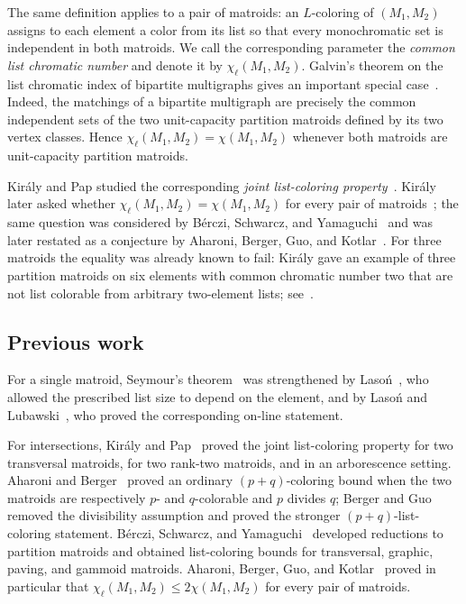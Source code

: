 \documentclass[10pt,a4paper]{article}
\theoremstyle{plain}
\theoremstyle{definition}
\begin{document}
The same definition applies to a pair of matroids: an $L$-coloring of $(M_1,M_2)$ assigns to each element a color from its list so that every monochromatic set is independent in both matroids. We call the corresponding parameter the \textit{common list chromatic number} and denote it by $\chi_\ell(M_1,M_2)$. Galvin's theorem on the list chromatic index of bipartite multigraphs gives an important special case~\cite{galvin1995list}. Indeed, the matchings of a bipartite multigraph are precisely the common independent sets of the two unit-capacity partition matroids defined by its two vertex classes. Hence $\chi_\ell(M_1,M_2)=\chi(M_1,M_2)$ whenever both matroids are unit-capacity partition matroids.

Kir\'aly and Pap studied the corresponding \textit{joint list-coloring property}~\cite{kiraly2010list}. Kir\'aly later asked whether $\chi_\ell(M_1,M_2)=\chi(M_1,M_2)$ for every pair of matroids~\cite{kiraly2013open}; the same question was considered by B\'erczi, Schwarcz, and Yamaguchi~\cite{berczi2021list} and was later restated as a conjecture by Aharoni, Berger, Guo, and Kotlar~\cite[Conjecture~5.4]{aharoni2025coloring}. For three matroids the equality was already known to fail: Kir\'aly gave an example of three partition matroids on six elements with common chromatic number two that are not list colorable from arbitrary two-element lists; see~\cite{berczi2021list}.

\subsection{Previous work}

For a single matroid, Seymour's theorem~\cite{seymour1998note} was strengthened by Laso\'n~\cite{lason2015list}, who allowed the prescribed list size to depend on the element, and by Laso\'n and Lubawski~\cite{lason2017online}, who proved the corresponding on-line statement.

For intersections, Kir\'aly and Pap~\cite{kiraly2010list} proved the joint list-coloring property for two transversal matroids, for two rank-two matroids, and in an arborescence setting. Aharoni and Berger~\cite{aharoni2006intersection} proved an ordinary $(p+q)$-coloring bound when the two matroids are respectively $p$- and $q$-colorable and $p$ divides $q$; Berger and Guo~\cite{berger2025coloring} removed the divisibility assumption and proved the stronger $(p+q)$-list-coloring statement. B\'erczi, Schwarcz, and Yamaguchi~\cite{berczi2021list} developed reductions to partition matroids and obtained list-coloring bounds for transversal, graphic, paving, and gammoid matroids. Aharoni, Berger, Guo, and Kotlar~\cite{aharoni2025coloring} proved in particular that $\chi_\ell(M_1,M_2)\le2\chi(M_1,M_2)$ for every pair of matroids.
\end{document}
